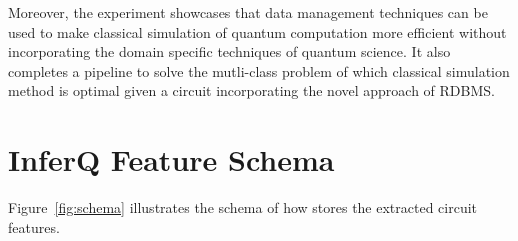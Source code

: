 \begin{appendices}
Moreover, the experiment  showcases that data management techniques can be used to make classical simulation of quantum computation more efficient without incorporating the domain specific techniques of quantum science. It also completes a pipeline to solve the mutli-class problem of which classical simulation method is optimal given a circuit incorporating the novel approach of RDBMS.

\section{InferQ Feature Schema}
\label{sec:inferqschemafull}
Figure~\ref{fig:schema} illustrates the schema of how \sys stores the extracted circuit features. 







\end{appendices}